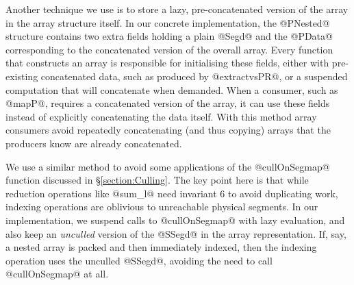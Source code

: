 Another technique we use is to store a lazy, pre-concatenated version of the array in the array structure itself. In our concrete implementation, the @PNested@ structure contains two extra fields holding a plain @Segd@ and the @PData@ corresponding to the concatenated version of the overall array. Every function that constructs an array is responsible for initialising these fields, either with pre-existing concatenated data, such as produced by @extractvsPR@, or a suspended computation that will concatenate when demanded. When a consumer, such as @mapP@, requires a concatenated version of the array, it can use these fields instead of explicitly concatenating the data itself. With this method array consumers avoid repeatedly concatenating (and thus copying) arrays that the producers know are already concatenated. 

We use a similar method to avoid some applications of the @cullOnSegmap@ function discussed in \S\ref{section:Culling}. The key point here is that while reduction operations like @sum_l@ need invariant 6 to avoid duplicating work, indexing operations are oblivious to unreachable physical segments. In our implementation, we suspend calls to @cullOnSegmap@ with lazy evaluation, and also keep an \emph{unculled} version of the @SSegd@ in the array representation. If, say, a nested array is packed and then immediately indexed, then the indexing operation uses the unculled @SSegd@, avoiding the need to call @cullOnSegmap@ at all.


